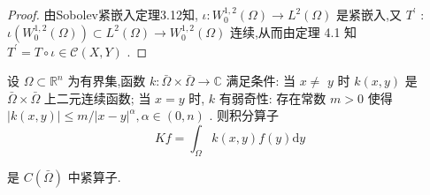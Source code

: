 \documentclass[lang=cn,newtx,10pt,scheme=chinese,thmcnt=chapter]{elegantbook}
\newcommand{\dif}{\mathrm{d}}
\begin{document}
\begin{proof}
    由Sobolev紧嵌入定理3.12知, \(\iota  : {W}_{0}^{1,2}\left( \Omega \right)  \rightarrow  {L}^{2}\left( \Omega \right)\) 是紧嵌入,又 \({T}^{\prime }\) : \(\iota \left( {{W}_{0}^{1,2}\left( \Omega \right) }\right)  \subset  {L}^{2}\left( \Omega \right)  \rightarrow  {W}_{0}^{1,2}\left( \Omega \right)\) 连续,从而由定理 4.1 知 \({T}^{\prime } = T \circ  \iota  \in  \mathcal{C}\left( {X,Y}\right)\) .

\end{proof}
\begin{example}
     设 \(\Omega  \subset  {\mathbb{R}}^{n}\) 为有界集,函数 \(k : \bar{\Omega } \times  \bar{\Omega } \rightarrow  \mathbb{C}\) 满足条件: 当 \(x \neq\)  \(y\) 时 \(k\left( {x,y}\right)\) 是 \(\bar{\Omega } \times  \bar{\Omega }\) 上二元连续函数; 当 \(x = y\) 时, \(k\) 有弱奇性: 存在常数 \(m > 0\) 使得 \(\left| {k\left( {x,y}\right) }\right|  \leqslant  m/{\left| x - y\right| }^{\alpha },\alpha  \in  \left( {0,n}\right)\) . 则积分算子
\begin{equation}
{Kf} = {\int }_{\Omega }k\left( {x,y}\right) f\left( y\right) {\dif y} \label{4.1}
\end{equation}

是 \(C\left( \bar{\Omega }\right)\) 中紧算子.
\end{example}
\end{document}
